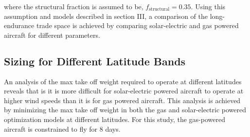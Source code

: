 \documentclass[]{aiaa-tc}%
\begin{document}
where the structural fraction is assumed to be, $f_{\text{structural}} = 0.35$. Using this assumption and models described in section III, a comparison of the long-endurance trade space is achieved by comparing solar-electric and gas powered aircraft for different parameters. 



\subsection{Sizing for Different Latitude Bands}

An analysis of the max take off weight required to operate at different latitudes reveals that is it is more difficult for solar-electric powered aircraft to operate at higher wind speeds than it is for gas powered aircraft.
This analysis is achieved by minimizing the max take off weight in both the gas and solar-electric powered optimization models at different latitudes. 
For this study, the gas-powered aircraft is constrained to fly for 8 days. 
\end{document}
